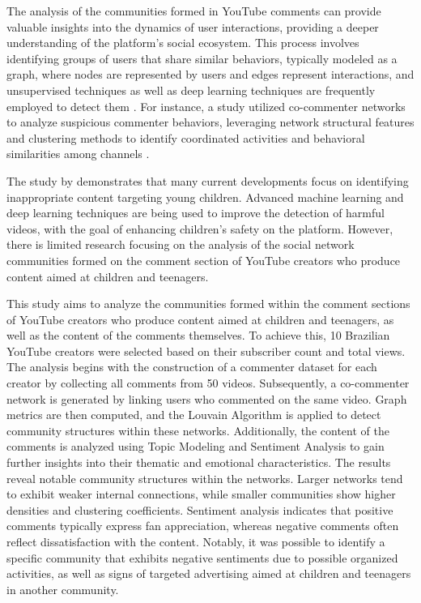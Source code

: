 \documentclass[12pt]{article}
\begin{document}
The analysis of the communities formed in YouTube comments can provide valuable 
insights into the dynamics of user interactions, providing a deeper understanding of 
the platform's social ecosystem. This process involves identifying groups of users that share similar
behaviors, typically modeled as a graph, where nodes are represented by users and edges represent 
interactions, and unsupervised techniques as well as deep learning techniques are frequently employed 
to detect them \cite{nooribakhsh2024community}. For instance, a study utilized co-commenter networks 
to analyze suspicious commenter behaviors, leveraging network structural features and clustering 
methods to identify coordinated activities and behavioral similarities among channels \cite{shajari2023} .

The study by \cite{app13064044} demonstrates that many current developments focus on identifying
inappropriate content targeting young children. Advanced machine learning and deep learning 
techniques are being used to improve the detection of harmful videos, with the goal of enhancing 
children's safety on the platform. However, there is limited research focusing on the analysis of 
the social network communities formed on the comment section of YouTube creators who 
produce content aimed at children and teenagers.

This study aims to analyze the communities formed within the comment sections of YouTube creators who 
produce content aimed at children and teenagers, as well as the content of the comments themselves. 
To achieve this, 10 Brazilian YouTube creators were selected based on their 
subscriber count and total views. The analysis begins with the construction of a commenter dataset for 
each creator by collecting all comments from 50 videos. Subsequently, a co-commenter network is 
generated by linking users who commented on the same video. Graph metrics are then computed, and the 
Louvain Algorithm is applied to detect community structures within these networks. Additionally, the 
content of the comments is analyzed using Topic Modeling and Sentiment Analysis to gain further 
insights into their thematic and emotional characteristics. 
The results reveal notable community structures within the networks. Larger networks tend to exhibit 
weaker internal connections, while smaller communities show higher densities and clustering coefficients. 
Sentiment analysis indicates that positive comments typically express fan appreciation, whereas negative 
comments often reflect dissatisfaction with the content. 
Notably, it was possible to identify a specific community that exhibits negative sentiments due 
to possible organized activities, as well as signs of targeted advertising aimed at children and teenagers 
in another community. 
\end{document}
